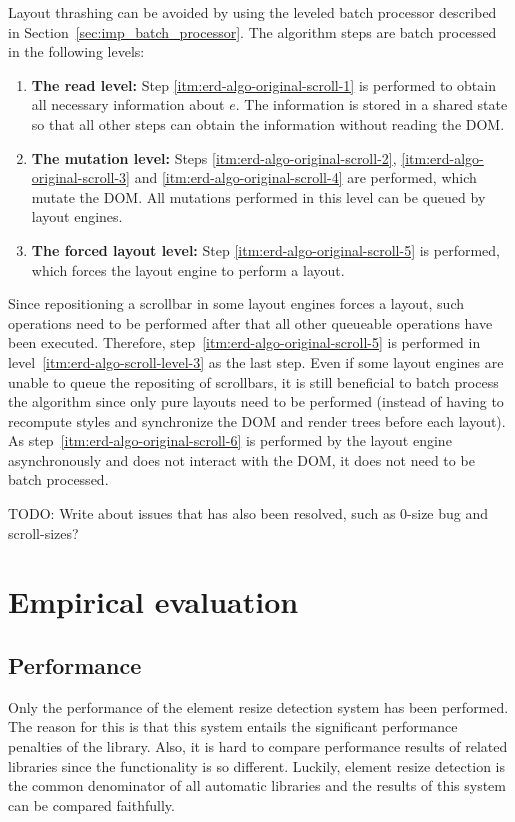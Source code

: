 \documentclass{acm_proc_article-sp}
\newcommand{\gls}[1]{#1}
\begin{document}
    Layout thrashing can be avoided by using the leveled batch processor described in Section~\ref{sec:imp_batch_processor}.
    The algorithm steps are batch processed in the following levels:
    \begin{enumerate}
      \item\label{itm:erd-algo-scroll-level-1}
        \textbf{The read level:}
        Step \ref{itm:erd-algo-original-scroll-1} is performed to obtain all necessary information about $e$.
        The information is stored in a shared state so that all other steps can obtain the information without reading the \gls{DOM}.
      \item\label{itm:erd-algo-scroll-level-2}
        \textbf{The mutation level:}
        Steps \ref{itm:erd-algo-original-scroll-2}, \ref{itm:erd-algo-original-scroll-3} and \ref{itm:erd-algo-original-scroll-4} are performed, which mutate the \gls{DOM}.
        All mutations performed in this level can be queued by layout engines.
      \item\label{itm:erd-algo-scroll-level-3}
        \textbf{The forced layout level:}
        Step \ref{itm:erd-algo-original-scroll-5} is performed, which forces the \gls{layout engine} to perform a layout.
    \end{enumerate}

    Since repositioning a scrollbar in some layout engines forces a layout, such operations need to be performed after that all other queueable operations have been executed.
    Therefore, step~\ref{itm:erd-algo-original-scroll-5} is performed in level~\ref{itm:erd-algo-scroll-level-3} as the last step.
    Even if some layout engines are unable to queue the repositing of scrollbars, it is still beneficial to batch process the algorithm since only pure layouts need to be performed (instead of having to recompute styles and synchronize the \gls{DOM} and render trees before each layout).
    As step~\ref{itm:erd-algo-original-scroll-6} is performed by the \gls{layout engine} asynchronously and does not interact with the \gls{DOM}, it does not need to be batch processed.

    TODO: Write about issues that has also been resolved, such as 0-size bug and scroll-sizes?

\section{Empirical evaluation}\label{sec:eval}
  \subsection{Performance}
    Only the performance of the element resize detection system has been performed.
    The reason for this is that this system entails the significant performance penalties of the library.
    Also, it is hard to compare performance results of related libraries since the functionality is so different.
    Luckily, element resize detection is the common denominator of all automatic libraries and the results of this system can be compared faithfully.
\end{document}
